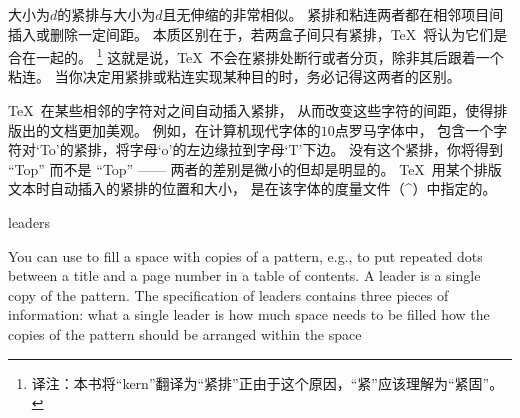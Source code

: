 {{{{{{%
大小为$d$的紧排与大小为$d$且无伸缩的非常相似。
紧排和粘连两者都在相邻项目间插入或删除一定间距。
本质区别在于，若两盒子间只有紧排，\TeX\ 将认为它们是合在一起的。
\footnote{译注：本书将“kern”翻译为“紧排”正由于这个原因，“紧”应该理解为“紧固”。}
这就是说，\TeX\ 不会在紧排处断行或者分页，除非其后跟着一个粘连。
当你决定用紧排或粘连实现某种目的时，务必记得这两者的区别。

\TeX\ 在某些相邻的字符对之间自动插入紧排，
从而改变这些字符的间距，使得排版出的文档更加美观。
例如，在计算机现代字体的$10$点罗马字体中，
包含一个字符对`To'的紧排，将字母`o'的左边缘拉到字母`T'下边。
没有这个紧排，你将得到 \hbox{“T{o}p”} 而不是 “Top” ——%
两者的差别是微小的但却是明显的。
\TeX\ 用某个排版文本时自动插入的紧排的位置和大小，
是在该字体的度量文件（^{\tfmfile}）中指定的。

\endconcept


\concept leaders

You can use  to fill a space with copies of
a pattern, e.g.,
to put repeated dots between a title and a page number in a table of contents.
A leader is a single copy of the pattern.
The specification of leaders contains three pieces of information:
\olist\compact
\li what a single leader is
\li how much space needs to be filled
\li how the copies of the pattern should be arranged within the space
\endolist

}}}}}}
